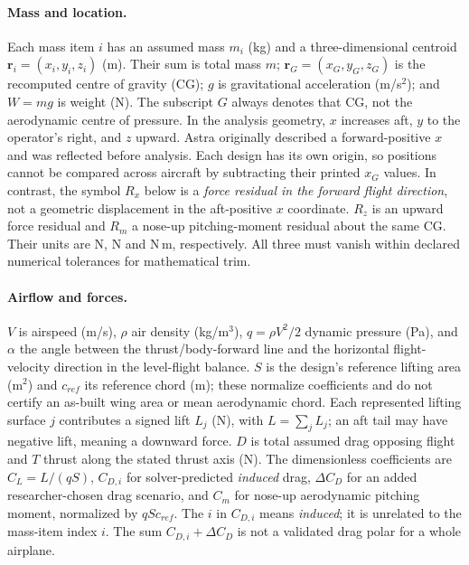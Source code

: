 \documentclass[11pt,a4paper]{article}
\begin{document}
\paragraph{Mass and location.} Each mass item $i$ has an assumed mass $m_i$ (kg) and a three-dimensional centroid $\boldsymbol r_i=(x_i,y_i,z_i)$ (m). Their sum is total mass $m$; $\boldsymbol r_G=(x_G,y_G,z_G)$ is the recomputed centre of gravity (CG); $g$ is gravitational acceleration (m/s$^2$); and $W=mg$ is weight (N). The subscript $G$ always denotes that CG, not the aerodynamic centre of pressure. In the analysis geometry, $x$ increases aft, $y$ to the operator's right, and $z$ upward. Astra originally described a forward-positive $x$ and was reflected before analysis. Each design has its own origin, so positions cannot be compared across aircraft by subtracting their printed $x_G$ values. In contrast, the symbol $R_x$ below is a \emph{force residual in the forward flight direction}, not a geometric displacement in the aft-positive $x$ coordinate. $R_z$ is an upward force residual and $R_m$ a nose-up pitching-moment residual about the same CG. Their units are N, N and N\,m, respectively. All three must vanish within declared numerical tolerances for mathematical trim.

\paragraph{Airflow and forces.} $V$ is airspeed (m/s), $\rho$ air density (kg/m$^3$), $q=\rho V^2/2$ dynamic pressure (Pa), and $\alpha$ the angle between the thrust/body-forward line and the horizontal flight-velocity direction in the level-flight balance. $S$ is the design's reference lifting area (m$^2$) and $c_{ref}$ its reference chord (m); these normalize coefficients and do not certify an as-built wing area or mean aerodynamic chord. Each represented lifting surface $j$ contributes a signed lift $L_j$ (N), with $L=\sum_j L_j$; an aft tail may have negative lift, meaning a downward force. $D$ is total assumed drag opposing flight and $T$ thrust along the stated thrust axis (N). The dimensionless coefficients are $C_L=L/(qS)$, $C_{D,i}$ for solver-predicted \emph{induced} drag, $\Delta C_D$ for an added researcher-chosen drag scenario, and $C_m$ for nose-up aerodynamic pitching moment, normalized by $qSc_{ref}$. The $i$ in $C_{D,i}$ means \emph{induced}; it is unrelated to the mass-item index $i$. The sum $C_{D,i}+\Delta C_D$ is not a validated drag polar for a whole airplane.
\end{document}
